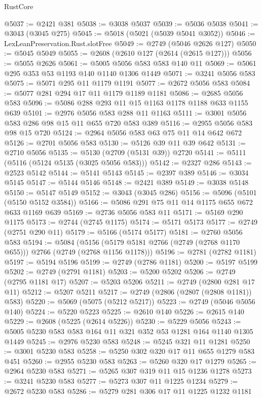 \begin{lexlean}{RustCore}
\begin{coremodule}
@5037 := @2421 @381
@5038 := @3038 @5037
@5039 := @5036 @5038
@5041 := @3043 (@3045 @275)
@5045 := @5018 (@5021 (@5039 @5041 @3052))
@5046 := LexLeanPreservation.Rust.slotFree
@5049 := @2749 (@5046 @2626 @127)
@5050 := @5045 @5049
@5055 := @2608 (@2610 @127 (@2614 (@2615 @127)))
@5056 := @5055 @2626
@5061 := @5005 @5056 @583 @583 @140 @11
@5069 := @5061 @295 @353 @53 @1193 @140 @1140 @1306 @1449
@5071 := @3241 @5056 @583
@5075 := @5071 @295 @11 @1179 @1191
@5077 := @2672 @5056 @583
@5084 := @5077 @281 @294 @17 @11 @1179 @1189 @1181
@5086 := @2685 @5056 @583
@5096 := @5086 @288 @293 @11 @15 @1163 @1178 @1188 @633 @1155 @639
@5101 := @2976 @5056 @583 @288 @11 @1163
@5111 := @3001 @5056 @583 @286 @98 @15 @11 @655 @720 @583 @389
@5116 := @2955 @5056 @583 @98 @15 @720
@5124 := @2964 @5056 @583 @63 @75 @11 @14 @642 @672
@5126 := @2701 @5056 @583
@5130 := @5126 @39 @11 @39 @642
@5131 := @2710 @5056
@5135 := @5130 (@2709 (@5131 @39)) @2720
@5141 := @5111 (@5116 (@5124 @5135 (@3025 @5056 @583)))
@5142 := @2327 @286
@5143 := @2523 @5142
@5144 := @5141 @5143
@5145 := @2397 @389
@5146 := @3034 @5145
@5147 := @5144 @5146
@5148 := @2421 @389
@5149 := @3038 @5148
@5150 := @5147 @5149
@5152 := @3043 (@3045 @286)
@5156 := @5096 (@5101 (@5150 @5152 @3584))
@5166 := @5086 @291 @75 @11 @14 @1175 @655 @672 @633 @1169 @639
@5169 := @2736 @5056 @583 @11
@5171 := @5169 @290 @1175
@5173 := @2744 (@2745 @1175)
@5174 := @5171 @5173
@5177 := @2749 (@2751 @290 @11)
@5179 := @5166 (@5174 @5177)
@5181 := @2760 @5056 @583
@5194 := @5084
    (@5156 (@5179 @5181 @2766 (@2749 (@2768 @1170 @655))) @2766 (@2749 (@2768 @1156 @1178)))
@5196 := @2781 (@2782 @1181)
@5197 := @5194 @5196
@5199 := @2749 (@2786 @1181)
@5200 := @5197 @5199
@5202 := @2749 (@2791 @1181)
@5203 := @5200 @5202
@5206 := @2749 (@2795 @1181 @17)
@5207 := @5203 @5206
@5211 := @2749 (@2800 @281 @17 @11)
@5212 := @5207 @5211
@5217 := @2749 (@2806 (@2807 (@2808 @1181)) @583)
@5220 := @5069 (@5075 (@5212 @5217))
@5223 := @2749 (@5046 @5056 @140)
@5224 := @5220 @5223
@5225 := @2610 @140
@5226 := @2615 @140
@5229 := @2608 (@5225 (@2614 @5226))
@5230 := @5229 @5056
@5243 := @5005 @5230 @583 @583 @164 @11 @321 @352 @53 @1281 @164 @1140 @1305 @1449
@5245 := @2976 @5230 @583
@5248 := @5245 @321 @11 @1281
@5250 := @3001 @5230 @583
@5258 := @5250 @302 @320 @17 @11 @655 @1279 @583 @451
@5260 := @2955 @5230 @583
@5263 := @5260 @320 @17 @1279
@5265 := @2964 @5230 @583
@5271 := @5265 @307 @319 @11 @15 @1236 @1278
@5273 := @3241 @5230 @583
@5277 := @5273 @307 @11 @1225 @1234
@5279 := @2672 @5230 @583
@5286 := @5279 @281 @306 @17 @11 @1225 @1232 @1181

\end{coremodule}
\end{lexlean}
